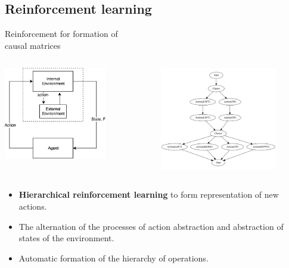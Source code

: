 \documentclass[default]{beamer}
\begin{document}
	\subsection{Reinforcement learning}
	\begin{frame}{Reinforcement for formation of\\causal matrices}
		\footnotesize
		
		\begin{columns}
			\begin{column}{0.5\textwidth}
				\centering
				\includegraphics[width=0.7\textwidth]{rl/schema.png}
			\end{column}
			\begin{column}{0.5\textwidth}
				\includegraphics[width=0.8\textwidth]{rl/autoham.png}
			\end{column}
		\end{columns}
		
		
		\begin{itemize}
			\item \textbf{Hierarchical reinforcement learning} to form representation of new actions.
			\item The alternation of the processes of action abstraction and abstraction of states of the environment.
			\item Automatic formation of the hierarchy of operations.
		\end{itemize}
		\vspace{-5pt}
		\nocite{*}
		\printbibliography[keyword={ham}, resetnumbers=true]
	\end{frame}	
\end{document}
